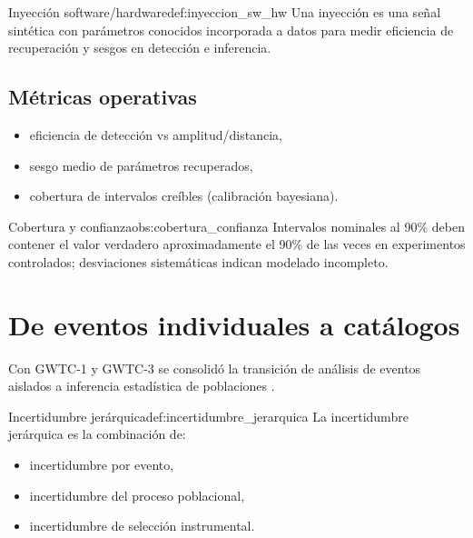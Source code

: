 \begin{definicion}{Inyección software/hardware}{def:inyeccion_sw_hw}
Una inyección es una señal sintética con parámetros conocidos incorporada a datos para medir eficiencia de recuperación y sesgos en detección e inferencia.
\end{definicion}

\subsection{Métricas operativas}

\begin{itemize}[leftmargin=2em]
  \item eficiencia de detección vs amplitud/distancia,
  \item sesgo medio de parámetros recuperados,
  \item cobertura de intervalos creíbles (calibración bayesiana).
\end{itemize}

\begin{observacion}{Cobertura y confianza}{obs:cobertura_confianza}
Intervalos nominales al 90\% deben contener el valor verdadero aproximadamente el 90\% de las veces en experimentos controlados; desviaciones sistemáticas indican modelado incompleto.
\end{observacion}

\section{De eventos individuales a catálogos}
\label{sec:eventos_catalogos}

Con GWTC-1 y GWTC-3 se consolidó la transición de análisis de eventos aislados a inferencia estadística de poblaciones \cite{GWTC1, GWTC3}.

\begin{definicion}{Incertidumbre jerárquica}{def:incertidumbre_jerarquica}
La incertidumbre jerárquica es la combinación de:
\begin{itemize}[leftmargin=2em]
  \item incertidumbre por evento,
  \item incertidumbre del proceso poblacional,
  \item incertidumbre de selección instrumental.
\end{itemize}
\end{definicion}

